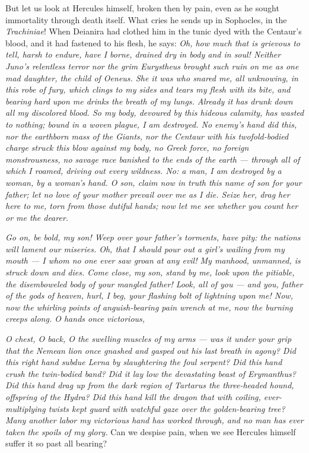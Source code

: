  But let us look at Hercules himself, broken then by pain, even as he sought immortality through death itself. What cries he sends up in Sophocles, in the \textit{Trachiniae}! When Deianira had clothed him in the tunic dyed with the Centaur's blood, and it had fastened to his flesh, he says: \textit{Oh, how much that is grievous to tell, harsh to endure, have I borne, drained dry in body and in soul! Neither Juno's relentless terror nor the grim Eurystheus brought such ruin on me as one mad daughter, the child of Oeneus. She it was who snared me, all unknowing, in this robe of fury, which clings to my sides and tears my flesh with its bite, and bearing hard upon me drinks the breath of my lungs. Already it has drunk down all my discolored blood. So my body, devoured by this hideous calamity, has wasted to nothing; bound in a woven plague, I am destroyed. No enemy's hand did this, nor the earthborn mass of the Giants, nor the Centaur with his twofold-bodied charge struck this blow against my body, no Greek force, no foreign monstrousness, no savage race banished to the ends of the earth — through all of which I roamed, driving out every wildness. No: a man, I am destroyed by a woman, by a woman's hand. O son, claim now in truth this name of son for your father; let no love of your mother prevail over me as I die. Seize her, drag her here to me, torn from those dutiful hands; now let me see whether you count her or me the dearer.}

 \textit{Go on, be bold, my son! Weep over your father's torments, have pity: the nations will lament our miseries. Oh, that I should pour out a girl's wailing from my mouth — I whom no one ever saw groan at any evil! My manhood, unmanned, is struck down and dies. Come close, my son, stand by me, look upon the pitiable, the disemboweled body of your mangled father! Look, all of you — and you, father of the gods of heaven, hurl, I beg, your flashing bolt of lightning upon me! Now, now the whirling points of anguish-bearing pain wrench at me, now the burning creeps along. O hands once victorious,}

 \textit{O chest, O back, O the swelling muscles of my arms — was it under your grip that the Nemean lion once gnashed and gasped out his last breath in agony? Did this right hand subdue Lerna by slaughtering the foul serpent? Did this hand crush the twin-bodied band? Did it lay low the devastating beast of Erymanthus? Did this hand drag up from the dark region of Tartarus the three-headed hound, offspring of the Hydra? Did this hand kill the dragon that with coiling, ever-multiplying twists kept guard with watchful gaze over the golden-bearing tree? Many another labor my victorious hand has worked through, and no man has ever taken the spoils of my glory.} Can we despise pain, when we see Hercules himself suffer it so past all bearing?


